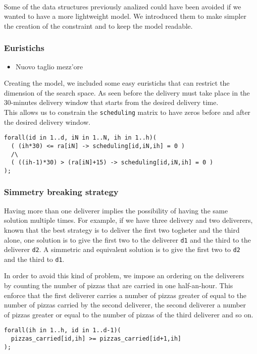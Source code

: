 \documentclass[10pt]{article}
\begin{document}
	\paragraph*{}
	Some of the data structures previously analized could have been avoided if we 
	wanted to have a more lightweight model. We introduced them to make simpler the
	creation of the constraint and to keep the model readable.

	\subsubsection{Euristichs}

	\begin{itemize}
		\item Nuovo taglio mezz'ore
	\end{itemize}

	Creating the model, we included some easy euristichs that can restrict the dimension
	of the search space. As seen before the delivery must take place in the 30-minutes delivery window
	that starts from the desired delivery time.\\
	This allows us to constrain the \texttt{scheduling} matrix to have zeros before
	and after the desired delivery window.
	\begin{verbatim}
forall(id in 1..d, iN in 1..N, ih in 1..h)(
  ( (ih*30) <= ra[iN] -> scheduling[id,iN,ih] = 0 )
  /\
  ( ((ih-1)*30) > (ra[iN]+15) -> scheduling[id,iN,ih] = 0 )
);
	\end{verbatim}

	\subsubsection{Simmetry breaking strategy}
	Having more than one deliverer implies the possibility of having the same solution 
	multiple times. For example, if we have three delivery and two deliverers, known that
	the best strategy is to deliver the first two togheter and the third alone, one solution is 
	to give the first two to the deliverer \texttt{d1} and the third to the deliverer \texttt{d2}.
	A simmetric and equivalent solution is to give the first two to \texttt{d2} and 
	the third to \texttt{d1}.

	In order to avoid this kind of problem, we impose an ordering on the deliverers by 
	counting the number of pizzas that are carried in one half-an-hour. This enforce that 
	the first deliverer carries a number of pizzas greater of equal to the number of
	pizzas carried by the second deliverer, the second deliverer a number of pizzas greater or 
	equal to the number of pizzas of the third deliverer and so on.
\begin{verbatim}
forall(ih in 1..h, id in 1..d-1)(
  pizzas_carried[id,ih] >= pizzas_carried[id+1,ih]
);
\end{verbatim}
\end{document}

